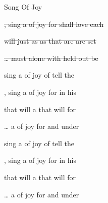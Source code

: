 \begin{SBSong}{Song Of Joy}
\begin{SBVerse}
    \sout{, sing a  of joy for  shall love 
    each }
  
    \sout{  will  just as  as  
     that are  are  set }
    
    \sout{\ldots {} must  alone with  
     held out be }
  \end{SBVerse}
  \begin{SBVerse}
     sing a  of joy of  
     tell the 
    
    , sing a  of joy for  
     in his 
  \end{SBVerse}
  \begin{SBVerse}
       that will  a  
     that will  for 
    
    \ldots {} a  of joy for  
     and under
  \end{SBVerse}
  \begin{SBVerse}
     sing a  of joy of  
     tell the 
    
    , sing a  of joy for  
     in his 
  \end{SBVerse}
  \begin{SBVerse}
       that will  a  
     that will  for 
    
    \ldots {} a  of joy for   
     and under
  \end{SBVerse}
\end{SBSong}

